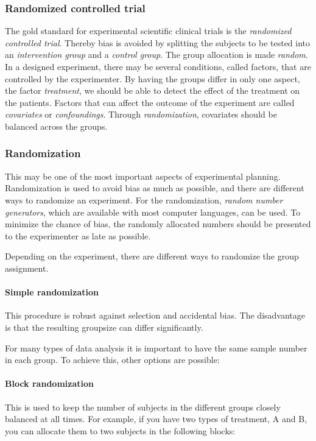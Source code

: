 \subsubsection{Randomized controlled trial} 
The gold standard for experimental scientific clinical trials is the \emph{randomized controlled trial}. Thereby bias is avoided by splitting the subjects to be tested into an \emph{intervention group} and a \emph{control group}. The group allocation is made \emph{random}.
In a designed experiment, there may be several conditions, called factors, that are controlled by the experimenter. By having the groups differ in only one aspect, the factor \emph{treatment}, we should be able to detect the effect of the treatment on the patients.
Factors that can affect the outcome of the experiment are called \emph{covariates} or \emph{confoundings}. Through \emph{randomization}, covariates should be balanced across the groups.

\subsubsection{Randomization} 
This may be one of the most important aspects of experimental planning. Randomization is used to avoid bias as much as possible, and there are different ways to randomize an experiment. For the randomization, \emph{random number generators}, which are available with most computer languages, can be used. To minimize the chance of bias, the randomly allocated numbers should be presented to the experimenter as late as possible.

Depending on the experiment, there are different ways to randomize the group assignment.

\paragraph{Simple randomization}
This procedure is robust against selection and accidental bias. The disadvantage is that the resulting groupsize can differ significantly.

For many types of data analysis it is important to have the same sample number in each group. To achieve this, other options are possible:

\paragraph{Block randomization}
This is used to keep the number of subjects in the different groups closely balanced at all times. For example, if you have two types of treatment, A and B, you can allocate them to two subjects in the following blocks:

